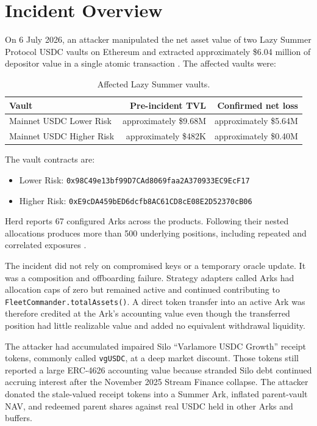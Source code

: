 \documentclass[11pt]{article}
\begin{document}
\section{Incident Overview}

On 6 July 2026, an attacker manipulated the net asset value of two Lazy Summer Protocol USDC vaults on Ethereum and extracted approximately \$6.04 million of depositor value in a single atomic transaction \cite{summer-postmortem}.  The affected vaults were:
\begin{table}[h]
    \centering
    \begin{tabular}{lrr}
        \toprule
        Vault & Pre-incident TVL & Confirmed net loss \\
        \midrule
        Mainnet USDC Lower Risk & approximately \$9.68M & approximately \$5.64M \\
        Mainnet USDC Higher Risk & approximately \$482K & approximately \$0.40M \\
        \bottomrule
    \end{tabular}
    \caption{Affected Lazy Summer vaults.}
\end{table}

The vault contracts are:
\begin{itemize}[nosep]
    \item Lower Risk: \nolinkurl{0x98C49e13bf99D7CAd8069faa2A370933EC9EcF17}
    \item Higher Risk: \nolinkurl{0xE9cDA459bED6dcfb8AC61CD8cE08E2D52370cB06}
\end{itemize}
Herd reports 67 configured Arks across the products.  Following their nested allocations produces more than 500 underlying positions, including repeated and correlated exposures \cite{herd-analysis}.

The incident did not rely on compromised keys or a temporary oracle update.  It was a composition and offboarding failure.  Strategy adapters called Arks had allocation caps of zero but remained active and continued contributing to \texttt{FleetCommander.totalAssets()}.  A direct token transfer into an active Ark was therefore credited at the Ark's accounting value even though the transferred position had little realizable value and added no equivalent withdrawal liquidity.

The attacker had accumulated impaired Silo ``Varlamore USDC Growth'' receipt tokens, commonly called \texttt{vgUSDC}, at a deep market discount.  Those tokens still reported a large ERC-4626 accounting value because stranded Silo debt continued accruing interest after the November 2025 Stream Finance collapse.  The attacker donated the stale-valued receipt tokens into a Summer Ark, inflated parent-vault NAV, and redeemed parent shares against real USDC held in other Arks and buffers.
\end{document}
